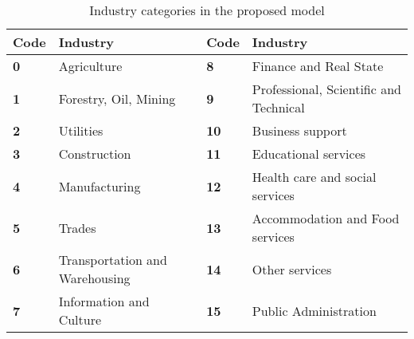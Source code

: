 \renewcommand{\arraystretch}{1}
\begin{table}[H]
    \begin{tabular}{p{1cm}p{7cm}p{1cm}p{7cm}}
        \textbf{Code} & \textbf{Industry} & \textbf{Code} & \textbf{Industry}\\
        \hline
        \rowcolor{lightgray} \textbf{0} & Agriculture & \textbf{8} & Finance and Real State\\

        \textbf{1} & Forestry, Oil, Mining & \textbf{9} & Professional, Scientific and Technical\\

        \rowcolor{lightgray} \textbf{2} & Utilities & \textbf{10} & Business support\\

        \textbf{3} & Construction & \textbf{11} & Educational services\\

        \rowcolor{lightgray} \textbf{4} & Manufacturing & \textbf{12} & Health care and social services\\

        \textbf{5} & Trades & \textbf{13} & Accommodation and Food services\\

        \rowcolor{lightgray} \textbf{6} & Transportation and Warehousing & \textbf{14} & Other services\\

        \textbf{7} & Information and Culture & \textbf{15} & Public Administration\\

        \hline
    \end{tabular}
    \caption{\label{table:industries} Industry categories in the proposed model}
\end{table}

